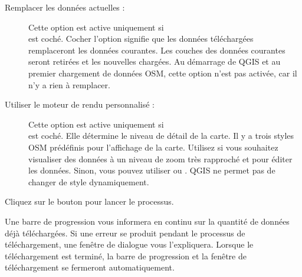 \begin{description}
\item[Remplacer les données actuelles :] Cette option est active uniquement si\\  est coché. Cocher l'option signifie que les données téléchargées remplaceront les données courantes. Les couches des données courantes seront retirées et les nouvelles chargées. Au démarrage de QGIS et au premier chargement de données OSM, cette option n'est pas activée, car il n'y a rien à remplacer.
\item[Utiliser le moteur de rendu personnalisé :] Cette option est active uniquement si\\  est coché. Elle détermine le niveau de détail de la carte. Il y a trois styles OSM prédéfinis pour l'affichage de la carte. Utilisez  si vous souhaitez visualiser des données à un niveau de zoom très rapproché et pour éditer les données. Sinon, vous pouvez utiliser  ou . QGIS \CURRENT ne permet pas de changer de style dynamiquement.
\end{description}

Cliquez sur le bouton  pour lancer le processus.

Une barre de progression vous informera en continu sur la quantité de données déjà téléchargées. Si une erreur se produit pendant le processus de téléchargement, une fenêtre de dialogue vous l'expliquera. Lorsque le téléchargement est terminé, la barre de progression et la fenêtre de téléchargement se fermeront automatiquement.

